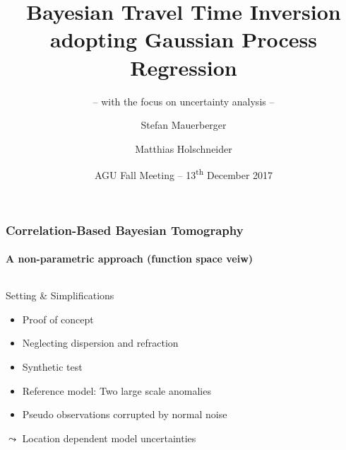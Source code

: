 \documentclass[aspectratio=169, t, 10pt]{beamer}
\title[Correlation based travel time inversion]{Bayesian Travel Time Inversion adopting Gaussian Process Regression}
\subtitle{-- with the focus on uncertainty analysis --}
\author[\tt mauerber@uni-potsdam.de]{Stefan Mauerberger \and Matthias Holschneider}
\institute[Math@UP]{University Potsdam, Institute of Mathematics}
\date[AGU~2017]{AGU Fall Meeting -- 13\textsuperscript{th} December 2017}
\begin{document}



\begin{frame}
    \frametitle{Correlation-Based Bayesian Tomography}
    \framesubtitle{A non-parametric approach (function space veiw)}

\begin{columns}%
%

    \begin{exampleblock}{Setting \& Simplifications}
        \begin{itemize}
            \item Proof of concept
            \item Neglecting dispersion and refraction
            \item Synthetic test
            \item Reference model: Two large scale anomalies
            \item Pseudo observations corrupted by normal noise
        \end{itemize}
        \hfill {\Large $\leadsto$} Location dependent model uncertainties ~
    \end{exampleblock}


    \vspace{-10mm}
\end{columns}

\end{frame}
\end{document}
